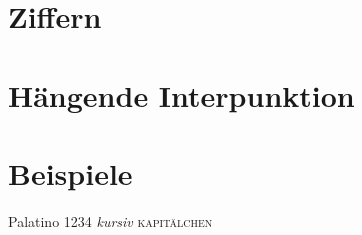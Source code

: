
\section{Ziffern}
\label{sec:Ziffern}


\section{Hängende Interpunktion}


\section{Beispiele}

{\selectfont Palatino 1234 \emph{kursiv} \textsc{kapitälchen}}


